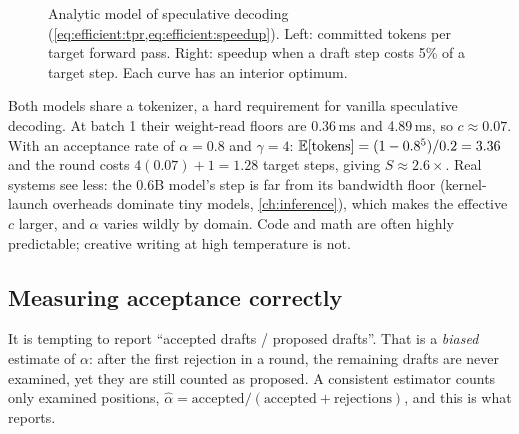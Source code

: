 \begin{figure}[t]
\centering
{}
\caption{Analytic model of speculative decoding (\cref{eq:efficient:tpr,eq:efficient:speedup}).
Left: committed tokens per target forward pass. Right: speedup when a draft step costs 5\%
of a target step. Each curve has an interior optimum.}
\label{fig:efficient:spec-curves}
\end{figure}

\begin{napkinmath}
Both models share a tokenizer, a hard requirement for vanilla speculative decoding. At
batch 1 their weight-read floors are 0.36\,ms and 4.89\,ms, so $c\approx 0.07$. With an
acceptance rate of $\alpha=0.8$ and $\gamma=4$:
$\mathbb{E}[\text{tokens}]=(1-0.8^5)/0.2=3.36$ and the round costs $4(0.07)+1=1.28$ target
steps, giving $S\approx 2.6\times$. Real systems see less: the 0.6B model's step is far
from its bandwidth floor (kernel-launch overheads dominate tiny models, \cref{ch:inference}),
which makes the effective $c$ larger, and $\alpha$ varies wildly by domain. Code and math
are often highly predictable; creative writing at high temperature is not.
\end{napkinmath}

\subsection{Measuring acceptance correctly}
It is tempting to report ``accepted drafts / proposed drafts''. That is a \emph{biased}
estimate of $\alpha$: after the first rejection in a round, the remaining drafts are
never examined, yet they are still counted as proposed. A consistent estimator counts
only examined positions,
$\hat\alpha=\text{accepted}/(\text{accepted}+\text{rejections})$, and this is what
 reports.

